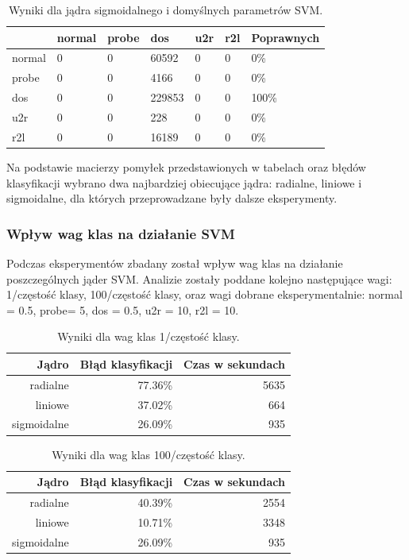 \documentclass[a4paper, 12pt]{article}
\begin{document}
\begin{table}[H]
\centering
\label{table:cm_svm_sigmoid_default}
\begin{tabular}{ | l | l | l | l | l | l | l | } \hline
	& normal &  probe &   dos  &  u2r  & r2l 	& Poprawnych	\\ \hline
  normal   &   0  &   0 & 60592  &  0  &  0 & 0\% \\ \hline
  probe    &   0  &   0 &  4166  &  0  &  0 & 0\% \\ \hline
  dos      &   0  &   0 & 229853 &  0  &  0 & 100\% \\ \hline
  u2r      &   0  &   0 &   228  &  0  &  0 & 0\% \\ \hline
  r2l      &   0  &   0 & 16189  &  0  &  0 & 0\% \\ \hline
\end{tabular} 
\caption{Wyniki dla jądra sigmoidalnego i domyślnych parametrów SVM.}
\end{table}

Na podstawie macierzy pomyłek przedstawionych w tabelach oraz błędów klasyfikacji wybrano dwa najbardziej obiecujące jądra: radialne, liniowe i sigmoidalne, dla których przeprowadzane były dalsze eksperymenty.

\subsubsection{Wpływ wag klas na działanie SVM}
Podczas eksperymentów zbadany został wpływ wag klas na działanie poszczególnych jąder SVM. Analizie zostały poddane kolejno następujące wagi: 1/częstość klasy, 100/częstość klasy, oraz wagi dobrane eksperymentalnie: normal = 0.5, probe= 5, dos = 0.5, u2r = 10, r2l = 10.

\begin{table}[H]
\centering
\begin{tabular}{ | r | r | r | } \hline
Jądro & Błąd klasyfikacji & Czas w sekundach \\ \hline
radialne & 77.36\% & 5635 \\ \hline
liniowe & 37.02\% & 664 \\ \hline
sigmoidalne & 26.09\% & 935 \\ \hline
\end{tabular} 
\caption{Wyniki dla wag klas 1/częstość klasy.}
\end{table}

\begin{table}[H]
\centering
\begin{tabular}{ | r | r | r | } \hline
Jądro & Błąd klasyfikacji & Czas w sekundach \\ \hline
radialne & 40.39\% & 2554 \\ \hline
liniowe & 10.71\% & 3348 \\ \hline
sigmoidalne & 26.09\% & 935 \\ \hline
\end{tabular} 
\caption{Wyniki dla wag klas 100/częstość klasy.}
\end{table}
\end{document}
